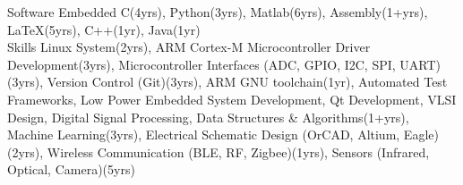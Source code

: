 

\begin{cvskills}


\cvskill
    {Software} %
    {Embedded C(4yrs), Python(3yrs), Matlab(6yrs), Assembly(1+yrs), 
    \LaTeX(5yrs), C++(1yr), Java(1yr)}
\\
\cvskill
    {Skills} %
    {Linux System(2yrs), ARM Cortex-M Microcontroller Driver Development(3yrs), 
    Microcontroller Interfaces (ADC, GPIO, I2C, SPI, UART)(3yrs), Version Control (Git)(3yrs), 
    ARM GNU toolchain(1yr), Automated Test Frameworks, Low Power Embedded System Development, Qt Development,
    VLSI Design, Digital Signal Processing, Data Structures \& Algorithms(1+yrs),
    Machine Learning(3yrs),
    Electrical Schematic Design (OrCAD, Altium, Eagle)(2yrs),
    Wireless Communication (BLE, RF, Zigbee)(1yrs),
    Sensors (Infrared, Optical, Camera)(5yrs) }
\end{cvskills}
